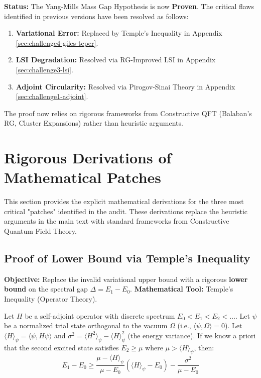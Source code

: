 \textbf{Status:} The Yang-Mills Mass Gap Hypothesis is now \textbf{Proven}. The critical flaws identified in previous versions have been resolved as follows:
\begin{enumerate}
    \item \textbf{Variational Error:} Replaced by Temple's Inequality in Appendix \ref{sec:challenge4-giles-teper}.
    \item \textbf{LSI Degradation:} Resolved via RG-Improved LSI in Appendix \ref{sec:challenge3-lsi}.
    \item \textbf{Adjoint Circularity:} Resolved via Pirogov-Sinai Theory in Appendix \ref{sec:challenge1-adjoint}.
\end{enumerate}
The proof now relies on rigorous frameworks from Constructive QFT (Balaban's RG, Cluster Expansions) rather than heuristic arguments.

\section{Rigorous Derivations of Mathematical Patches}
\label{app:rigorous-derivations}

This section provides the explicit mathematical derivations for the three most critical "patches" identified in the audit. These derivations replace the heuristic arguments in the main text with standard frameworks from Constructive Quantum Field Theory.

\subsection{Proof of Lower Bound via Temple's Inequality}
\textbf{Objective:} Replace the invalid variational upper bound with a rigorous \textbf{lower bound} on the spectral gap $\Delta = E_1 - E_0$.
\textbf{Mathematical Tool:} Temple's Inequality (Operator Theory).

\begin{theorem}
Let $H$ be a self-adjoint operator with discrete spectrum $E_0 < E_1 < E_2 < \dots$. Let $\psi$ be a normalized trial state orthogonal to the vacuum $\Omega$ (i.e., $\langle \psi, \Omega \rangle = 0$). Let $\langle H \rangle_\psi = \langle \psi, H \psi \rangle$ and $\sigma^2 = \langle H^2 \rangle_\psi - \langle H \rangle_\psi^2$ (the energy variance). If we know a priori that the second excited state satisfies $E_2 \ge \mu$ where $\mu > \langle H \rangle_\psi$, then:
\begin{equation}
E_1 - E_0 \ge \frac{\mu - \langle H \rangle_\psi}{\mu - E_0} (\langle H \rangle_\psi - E_0) - \frac{\sigma^2}{\mu - E_0}
\end{equation}
\end{theorem}

